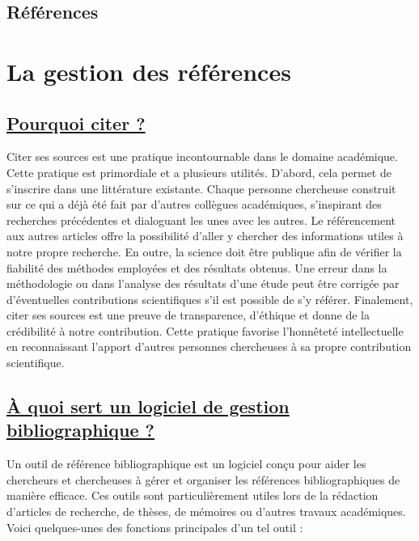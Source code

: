 \documentclass[
  letterpaper,
]{scrbook}
\begin{document}
\hypertarget{ruxe9fuxe9rences}{%
\section{Références}\label{ruxe9fuxe9rences}}


\hypertarget{sec-chap6}{%
\chapter{La gestion des références}\label{sec-chap6}}

\hypertarget{pourquoi-citer}{%
\section{\texorpdfstring{\ul{Pourquoi citer
?}}{Pourquoi citer ?}}\label{pourquoi-citer}}

Citer ses sources est une pratique incontournable dans le domaine
académique. Cette pratique est primordiale et a plusieurs utilités.
D'abord, cela permet de s'inscrire dans une littérature existante.
Chaque personne chercheuse construit sur ce qui a déjà été fait par
d'autres collègues académiques, s'inspirant des recherches précédentes
et dialoguant les unes avec les autres. Le référencement aux autres
articles offre la possibilité d'aller y chercher des informations utiles
à notre propre recherche. En outre, la science doit être publique afin
de vérifier la fiabilité des méthodes employées et des résultats
obtenus. Une erreur dans la méthodologie ou dans l'analyse des résultats
d'une étude peut être corrigée par d'éventuelles contributions
scientifiques s'il est possible de s'y référer. Finalement, citer ses
sources est une preuve de transparence, d'éthique et donne de la
crédibilité à notre contribution. Cette pratique favorise l'honnêteté
intellectuelle en reconnaissant l'apport d'autres personnes chercheuses
à sa propre contribution scientifique.

\hypertarget{uxe0-quoi-sert-un-logiciel-de-gestion-bibliographique}{%
\section{\texorpdfstring{\ul{À quoi sert un logiciel de gestion
bibliographique
?}}{À quoi sert un logiciel de gestion bibliographique ?}}\label{uxe0-quoi-sert-un-logiciel-de-gestion-bibliographique}}

Un outil de référence bibliographique est un logiciel conçu pour aider
les chercheurs et chercheuses à gérer et organiser les références
bibliographiques de manière efficace. Ces outils sont particulièrement
utiles lors de la rédaction d'articles de recherche, de thèses, de
mémoires ou d'autres travaux académiques. Voici quelques-unes des
fonctions principales d'un tel outil :
\end{document}

